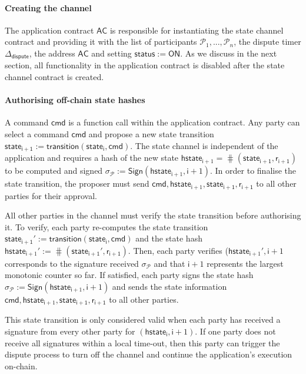 \documentclass{llncs}
\newcommand{\chanstatus}{\mathsf{status}}
\newcommand{\chanon}{\mathsf{ON}}
\newcommand{\cmd}{\mathsf{cmd}}
\newcommand{\hstatei}{\mathsf{hstate}_{\monotoniccounter}}
\newcommand{\hstateplus}{\ensuremath{\mathsf{hstate}_{\monotoniccounter+1}}}
\newcommand{\monotoniccounter}{\mathsf{i}}
\newcommand{\stateinfoi}{\mathsf{state}_{\mathsf{i}}}
\newcommand{\stateinfoplus}{\mathsf{state}_{\mathsf{i+1}}}
\newcommand{\participant}{\mathcal{P}}
\newcommand{\ranplus}{\mathsf{r}_{\mathsf{i+1}}}
\newcommand{\sign}{\mathsf{Sign}}
\newcommand{\appcontract}{\mathsf{AC}}
\newcommand{\timerdispute}{\mathsf{\Delta}_{\mathsf{dispute}}}
\begin{document}
\paragraph{Creating the channel} 

The application contract $\appcontract$ is responsible for instantiating the state channel contract and providing it with the list of participants $\participant_{1},...,\participant_{n}$, the dispute timer $\timerdispute$, the address $\appcontract$ and setting $\chanstatus := \chanon$. 
As we discuss in the next section, all functionality in the application contract is disabled after the state channel contract is created. 

\paragraph{Authorising off-chain state hashes}
A command $\cmd$ is a function call within the application contract.
Any party can select a command $\cmd$ and propose a new state transition $\stateinfoplus := \mathsf{transition}(\stateinfoi, \cmd)$.
The state channel is independent of the application and requires a hash of the new state  $\hstateplus = \hash(\stateinfoplus, \ranplus)$ to be computed and signed  $\sigma_{\participant} := \sign(\hstateplus,\monotoniccounter+1)$.
In order to finalise the state transition, the proposer  must send $\cmd,\hstateplus, \stateinfoplus, \ranplus$ to all other parties for their approval.

All other parties in the channel must verify the state transition before authorising it. 
To verify, each party re-computes the state transition $\stateinfoplus' := \mathsf{transition}(\stateinfoi, \cmd)$ and the state hash $\hstateplus' := \hash(\stateinfoplus', \ranplus)$.
Then, each party verifies  ($\hstateplus', \monotoniccounter+1$ corresponds to the signature received $\sigma_{\participant}$ and that $\monotoniccounter+1$ represents the largest monotonic counter so far. 
If satisfied, each party signs the state hash  $\sigma_{\participant} := \sign(\hstateplus,\monotoniccounter+1)$ and sends the state information  $\cmd,\hstateplus, \stateinfoplus, \ranplus$ to all other parties. 

This state transition is only considered valid when each party has received a signature from every other party for $(\hstatei, \monotoniccounter+1)$. If one party does not receive all signatures within a local time-out, then this party can trigger the dispute process to turn off the channel and continue the application's execution on-chain. 
\end{document}
